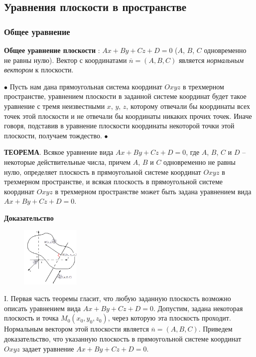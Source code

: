 \documentclass{article}
\begin{document}
\subsection{Уравнения плоскости в пространстве}
\subsubsection{Общее уравнение}
\textbf{Общее уравнение плоскости} : $Ax + By + Cz + D = 0$ ($A$, $B$, $C$ одновременно не равны
нулю). Вектор с координатами $\overline{n}=(A, B, C)$ является \textit{нормальным вектором} к плоскости.

$\bullet$ Пусть нам дана прямоугольная система координат $Oxyz$ в трехмерном пространстве, уравнением плоскости в заданной системе координат будет такое уравнение с тремя неизвестными $x$, $y$, $z$, которому отвечали бы координаты всех точек этой плоскости и не отвечали бы координаты никаких прочих точек. Иначе говоря, подставив в уравнение плоскости координаты некоторой точки этой плоскости, получаем тождество. $\bullet$ 

\textbf{ТЕОРЕМА}. Всякое уравнение вида $Ax+By+Cz+D=0$, где $A$, $B$, $C$ и $D$ -- некоторые действительные числа, причем $A$, $B$ и $C$ одновременно не равны нулю, определяет плоскость в прямоугольной системе координат $Oxyz$ в трехмерном пространстве, и всякая плоскость в прямоугольной системе координат $Oxyz$ в трехмерном пространстве может быть задана уравнением вида $Ax+By+Cz+D=0$.

\textbf{Доказательство}

\begin{figure}
    \centering
    \includegraphics[width=0.25\textwidth]{image015.png}
\end{figure}
I. Первая часть теоремы гласит, что любую заданную плоскость возможно описать уравнением вида $Ax+By+Cz+D=0$. Допустим, задана некоторая плоскость и точка $M_0(x_0,y_0,z_0)$, через которую эта плоскость проходит. Нормальным вектором этой плоскости является $\overline{n}=(A,B,C)$. Приведем доказательство, что указанную плоскость в прямоугольной системе координат $Oxyz$
задает уравнение $Ax+By+Cz+D=0$.
\end{document}
